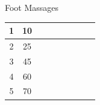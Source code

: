\documentclass{beamer}
\begin{document}
\begin{frame}{Foot Massages}
\begin{table}[]
\begin{tabular}{c|c|l|l|l|l|l|l|l}
    1                                                                            & 10                                                                                     &                                                       &                                                          &                                                       &                                                               &                                                               &                                                                  &                                                          \\ \hline
    2                                                                            & 25                                                                                     &                                                       &                                                          &                                                       &                                                               &                                                               &                                                                  &                                                          \\ \hline
    3                                                                            & 45                                                                                     &                                                       &                                                          &                                                       &                                                               &                                                               &                                                                  &                                                          \\ \hline
    4                                                                            & 60                                                                                     &                                                       &                                                          &                                                       &                                                               &                                                               &                                                                  &                                                          \\ \hline
    5                                                                            & 70                                                                                     &                                                       &                                                          &                                                       &                                                               &                                                               &                                                                  &                                                         

\end{tabular}
\end{table}
\end{frame}
\end{document}
